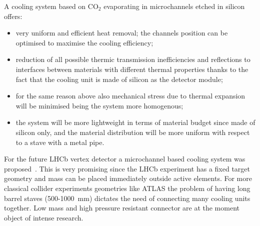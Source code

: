 A cooling system based on CO$_2$ evaporating in microchannels etched in silicon   offers:
\begin{itemize}
\item very uniform and efficient heat removal; the channels position can be optimised to maximise the 
cooling efficiency;
\item reduction of all possible thermic transmission inefficiencies and  reflections to interfaces between 
materials with different thermal properties thanks to the fact that the cooling unit is made of silicon as the 
detector module;
\item for the same reason above also mechanical stress due to thermal expansion will be minimised being 
the system more homogenous;
\item the system will be more lightweight in terms of material budget since made of silicon only, and 
the material distribution will be more uniform with respect to a stave with a metal pipe.
\end{itemize}


For the future LHCb vertex detector a microchannel based cooling system was 
proposed~\cite{1748-0221-8-04-P04004}. This is very promising since the LHCb experiment has 
a fixed target geometry and mass can be placed immediately outside active elements. 
For more classical collider experiments geometries like ATLAS the problem of having long barrel staves 
(500-1000~mm) dictates the need of connecting many cooling units together. Low mass and high 
pressure resistant connector are at the moment object of intense research. 

